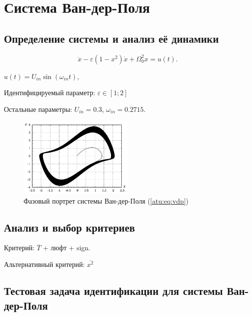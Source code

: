 
\FloatBarrier

\section{Система Ван-дер-Поля} %
\label{atu:sect:vdp}


\subsection{Определение системы и анализ её динамики} %

\begin{equation}
 \ddot{x} - \varepsilon (1-x^2)  \dot{x} + \Omega_0^2 x  = u(t) .
\label{atu:eq:vdp}
\end{equation}

\( u(t) = U_{in} \sin ( \omega_{in} t ) \),

Идентифицируемый параметр:
\( \varepsilon \in [1;2]  \)

Остальные параметры:
\(U_{in}=0.3\),
\(\omega_{in}=0.2715\).


\begin{figure}[htb!]
\centerline{\includegraphics[width=0.5\textwidth]{p/cha/vdp_phase.pdf} }
\caption{Фазовый портрет системы Ван-дер-Поля (\ref{atu:eq:vdp})}
\label{atu:f:vdp_phase}
\end{figure}



\subsection{Анализ и выбор критериев}  %

Критерий:
$\overline{T}$ + люфт + sign.

Альтернативный критерий:
$\overline{x^2}$


\subsection{Тестовая задача идентификации для системы Ван-дер-Поля}  %

